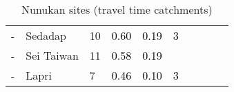 \begin{table}[ht]
\begin{tabular}{C{0.05\textwidth}C{0.15\textwidth}C{0.08\textwidth}C{0.08\textwidth}C{0.08\textwidth}C{0.08\textwidth}C{0.08\textwidth}C{0.08\textwidth}C{0.08\textwidth}C{0.08\textwidth}}
  {-} & Sedadap &  10 & \textcolor[HTML]{000000}{0.60} & \textcolor[HTML]{000000}{0.19} & \textcolor[HTML]{000000}{3} &  &  &  &  \\ 
  {-} & Sei Taiwan &  11 & \textcolor[HTML]{000000}{0.58} & \textcolor[HTML]{000000}{0.19} & \textcolor[HTML]{FFFFFF}{4} &  &  &  &  \\ 
  {-} & Lapri &   7 & \textcolor[HTML]{000000}{0.46} & \textcolor[HTML]{000000}{0.10} & \textcolor[HTML]{000000}{3} &  &  &  &  \\ 
  \end{tabular}
\endgroup
\caption{Nunukan sites (travel time catchments)} 
\end{table}
